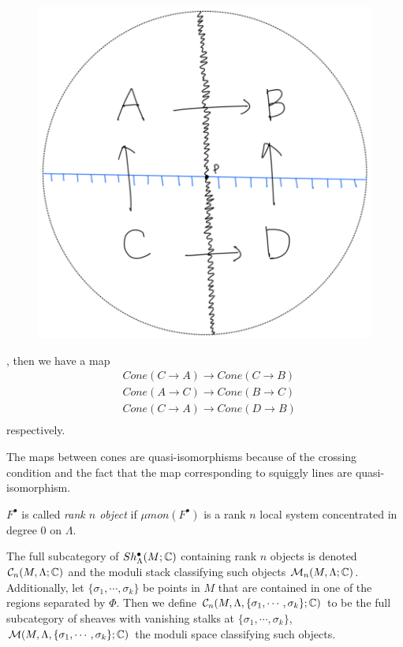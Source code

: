 \begin{itemize}
\begin{itemize}
\begin{figure}[H]
    \caption{}
    \label{fig:your-label}
\end{figure}
\begin{figure}[H] 
    \centering
    \includegraphics[scale = 0.55]{diagrams/intro/6.png}
    \caption{}
    \label{fig:your-label}
\end{figure}
, then we have a map
\begin{align*}
& Cone(C\rightarrow A) \rightarrow Cone(C\rightarrow B)\\
& Cone(A\rightarrow C) \rightarrow Cone(B\rightarrow C)\\
& Cone(C\rightarrow A) \rightarrow Cone(D\rightarrow B)\\
\end{align*}
respectively.
\end{itemize}
\end{itemize}
The maps between cones are quasi-isomorphisms because of the crossing condition and the fact that the map corresponding to squiggly lines are quasi-isomorphism.

\begin{definition}
$F^\bullet$ is called \emph{rank $n$ object} if $\mu mon (F^\bullet)$ is a rank $n$ local system concentrated in degree $0$ on $\Lambda$.
\end{definition}

\begin{definition}
The full subcategory of $Sh^\bullet_\Lambda(M;\mathbb{C})$ containing rank $n$ objects is denoted $\mathcal{C}_n(M,\Lambda;\mathbb{C})$ and the moduli stack classifying such objects $\mathcal{M}_n(M,\Lambda;\mathbb{C})$. Additionally, let $\{\sigma_1,\cdots,\sigma_k\}$ be points in $M$ that are contained in one of the regions separated by $\Phi$. Then we define $\mathcal{C}_n(M,\Lambda, \{\sigma_1,\cdots,\sigma_k\};\mathbb{C})$ to be the full subcategory of sheaves with vanishing stalks at $\{\sigma_1,\cdots,\sigma_k\}$, $\mathcal{M}(M,\Lambda, \{\sigma_1,\cdots,\sigma_k\};\mathbb{C})$ the moduli space classifying such objects.
\end{definition}

